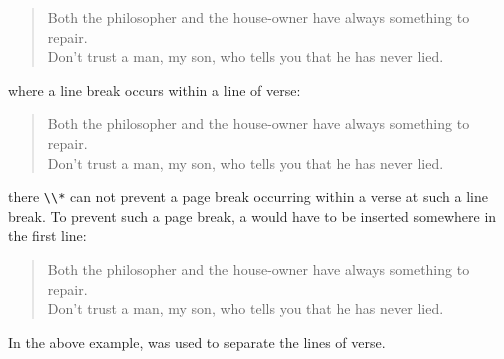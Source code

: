 \begin{Example}
\begin{lstcode}
  \begin{verse}
    Both the philosopher and the house-owner
    have always something to repair.\\
    \bigskip
    Don't trust a man, my son, who tells you
    that he has never lied.
  \end{verse}
\end{lstcode}
      where a line break occurs within a line of verse:
      \begin{ShowOutput}
        \begin{verse}
          Both the philosopher and the house-owner
          have always something to repair.\\
          \bigskip
          Don't trust a man, my son, who tells you
          that he has never lied.
        \end{verse}
      \end{ShowOutput}
      there \verb|\\*| can not prevent a page break occurring within a verse
      at such a line break. To prevent such a page break, a
       would have to be inserted
      somewhere in the first line:
\begin{lstcode}
  \begin{verse}
    Both the philosopher and the house-owner\nopagebreak
    have always something to repair.\\
    \bigskip
    Don't trust a man, my son, who tells you\nopagebreak
    that he has never lied.
  \end{verse}
\end{lstcode}

      In the above example,  was used to separate the lines of
      verse.
    \end{Example}
  \fi %
  \EndIndexGroup

